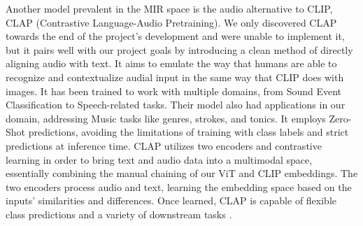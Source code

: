 Another model prevalent in the MIR space is the audio alternative to CLIP, CLAP (Contrastive Language-Audio Pretraining). We only discovered CLAP towards the end of the project’s development and were unable to implement it, but it pairs well with our project goals by introducing a clean method of directly aligning audio with text. It aims to emulate the way that humans are able to recognize and contextualize audial input in the same way that CLIP does with images. It has been trained to work with multiple domains, from Sound Event Classification to Speech-related tasks. Their model also had applications in our domain, addressing Music tasks like genres, strokes, and tonics. It employs Zero-Shot predictions, avoiding the limitations of training with class labels and strict predictions at inference time. CLAP utilizes two encoders and contrastive learning in order to bring text and audio data into a multimodal space, essentially combining the manual chaining of our ViT and CLIP embeddings. The two encoders process audio and text, learning the embedding space based on the inputs’ similarities and differences. Once learned, CLAP is capable of flexible class predictions and a variety of downstream tasks \cite{CLAP}.